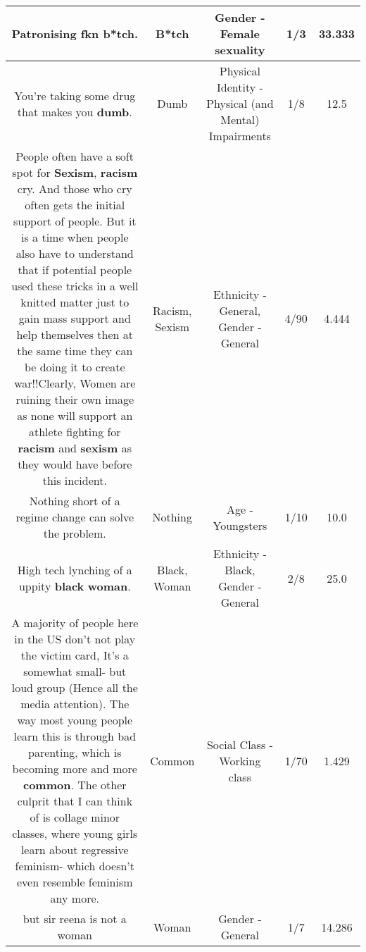 \documentclass[11pt]{article}
\newlength\mylength
\begin{document}
\begin{center}
\begin{longtable}{|C{.65\mylength}|C{.30\mylength}|C{.12\mylength}|C{.12\mylength}|C{.12\mylength}|}
  \small Patronising fkn \textbf{b*tch}.\normalsize   & B*tch & Gender - Female sexuality & 1/3 & 33.333 \\  \hline
  \small You're taking some drug that makes you \textbf{dumb}.\normalsize   & Dumb & Physical Identity - Physical (and Mental) Impairments & 1/8 & 12.5 \\  \hline
  \small People often have a soft spot for \textbf{Sexism}, \textbf{racism} cry. And those who cry often gets the initial support of people. But it is a time when people also have to understand that if potential people used these tricks in a well knitted matter just to gain mass support and help themselves then at the same time they can be doing it to create war!!Clearly, Women are ruining their own image as none will support an athlete fighting for \textbf{racism} and \textbf{sexism} as they would have before this incident.\normalsize   & Racism, Sexism & Ethnicity - General, Gender - General & 4/90 & 4.444 \\  \hline
  \small Nothing short of a regime change can solve the problem.\normalsize   & Nothing & Age - Youngsters & 1/10 & 10.0 \\  \hline
  \small High tech lynching of a uppity \textbf{black} \textbf{woman}.\normalsize   & Black, Woman & Ethnicity - Black, Gender - General & 2/8 & 25.0 \\  \hline
  \small A majority of people here in the US don't not play the victim card, It's a somewhat small- but loud group (Hence all the media attention). The way most young people learn this is through bad parenting, which is becoming more and more \textbf{common}. The other culprit that I can think of is collage minor classes, where young girls learn about regressive feminism- which doesn't even resemble feminism any more.\normalsize   & Common & Social Class - Working class & 1/70 & 1.429 \\  \hline
  \small but sir reena is not a woman\normalsize   & Woman & Gender - General & 1/7 & 14.286 \\  \hline

\end{longtable}
\end{center}
\end{document}
